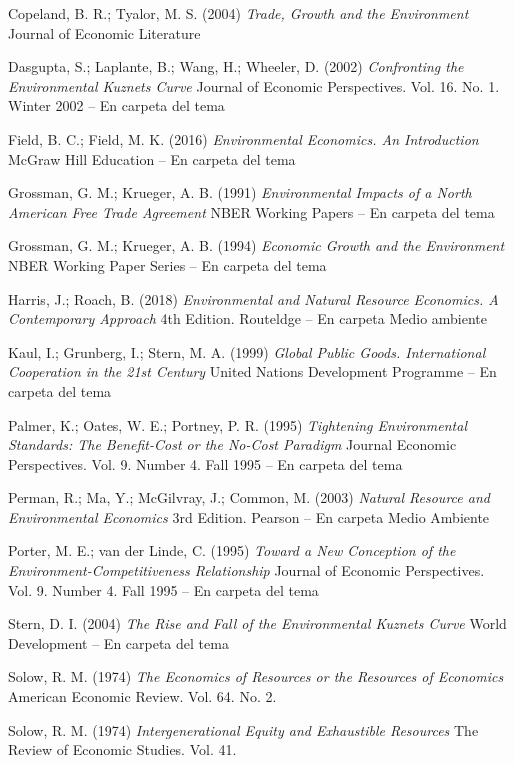 \documentclass{nuevotema}
\begin{document}
Copeland, B. R.; Tyalor, M. S. (2004) \textit{Trade, Growth and the Environment} Journal of Economic Literature

Dasgupta, S.; Laplante, B.; Wang, H.; Wheeler, D. (2002) \textit{Confronting the Environmental Kuznets Curve} Journal of Economic Perspectives. Vol. 16. No. 1. Winter 2002 -- En carpeta del tema

Field, B. C.; Field, M. K. (2016) \textit{Environmental Economics. An Introduction} McGraw Hill Education -- En carpeta del tema

Grossman, G. M.; Krueger, A. B. (1991) \textit{Environmental Impacts of a North American Free Trade Agreement} NBER Working Papers -- En carpeta del tema

Grossman, G. M.; Krueger, A. B. (1994) \textit{Economic Growth and the Environment} NBER Working Paper Series -- En carpeta del tema

Harris, J.; Roach, B. (2018) \textit{Environmental and Natural Resource Economics. A Contemporary Approach} 4th Edition. Routeldge -- En carpeta Medio ambiente

Kaul, I.; Grunberg, I.; Stern, M. A. (1999) \textit{Global Public Goods. International Cooperation in the 21st Century} United Nations Development Programme -- En carpeta del tema 

Palmer, K.; Oates, W. E.; Portney, P. R. (1995) \textit{Tightening Environmental Standards: The Benefit-Cost or the No-Cost Paradigm} Journal Economic Perspectives. Vol. 9. Number 4. Fall 1995 -- En carpeta del tema

Perman, R.; Ma, Y.; McGilvray, J.; Common, M. (2003) \textit{Natural Resource and Environmental Economics} 3rd Edition. Pearson -- En carpeta Medio Ambiente

Porter, M. E.; van der Linde, C. (1995) \textit{Toward a New Conception of the Environment-Competitiveness Relationship} Journal of Economic Perspectives. Vol. 9. Number 4. Fall 1995 -- En carpeta del tema

Stern, D. I. (2004) \textit{The Rise and Fall of the Environmental Kuznets Curve} World Development -- En carpeta del tema

Solow, R. M. (1974) \textit{The Economics of Resources or the Resources of Economics} American Economic Review. Vol. 64. No. 2. 

Solow, R. M. (1974) \textit{Intergenerational Equity and Exhaustible Resources} The Review of Economic Studies. Vol. 41.
\end{document}
